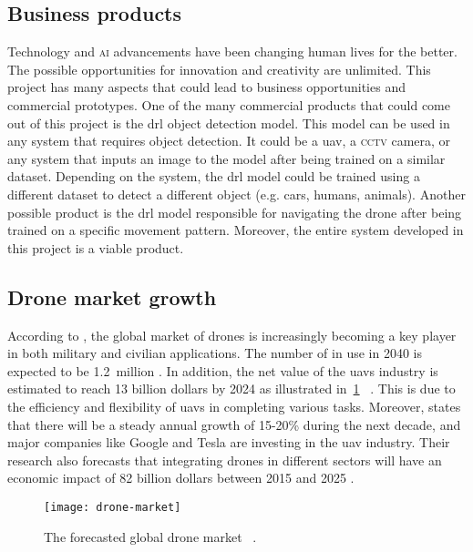 \documentclass[../main.tex]{subfiles}
\begin{document}
\subsection{Business products}
        Technology and \textsc{ai} advancements have been changing human lives for the better.
	The possible opportunities for innovation and creativity are unlimited. This
	project has many aspects that could lead to business opportunities and commercial
	prototypes. 
	One of the many commercial products that could come out of this project is
	the \gls{drl} object detection model. This model can be used in any system
	that requires object detection. It could be a \gls{uav}, a \textsc{cctv} camera, or
	any system that inputs an image to the model after being trained on a similar 
	dataset.
	Depending on the system, the \gls{drl} model could be trained using a different
	dataset to detect a different object (e.g. cars, humans, animals).
	Another possible product is the \gls{drl} model responsible for navigating the
	drone after being trained on a specific movement pattern.
	Moreover, the entire system developed in this project is a viable product.
	
\subsection{Drone market growth}
	According to \textcite{Atwater15Commercial}, the global market of drones is 
	increasingly becoming a key player in both military and civilian applications. 
        The number of \uavs in use in 2040 is expected to 
        be \SI{1.2}{million} \cite{Amo19}. In addition,
	the net value of the \glspl{uav} industry is estimated to reach 13 billion dollars
	by 2024 as illustrated in~\cref{fig:drone-market}%
        ~\cite{Mic14}. This is due to the efficiency 
	and flexibility of \glspl{uav} in completing various tasks. 
	Moreover, \textcite{Yes19} states that there will be a steady annual growth of 
	15-20\% during the next decade, and major companies like Google and Tesla are investing
	in the \gls{uav} industry. Their research also forecasts that integrating drones in
	different sectors will have an economic impact of 82 billion dollars between 2015 
        and 2025 \cite{Yes19}.
	
\begin{figure}[tbp] 
        \centering
        \texttt{[image: drone-market]}
        \caption[The forecasted global drone market.]
        {The forecasted global drone market~%
        \cite[Fig.~2]{Mic14}.} 
        \label{fig:drone-market} 
\end{figure}
	
\end{document}
